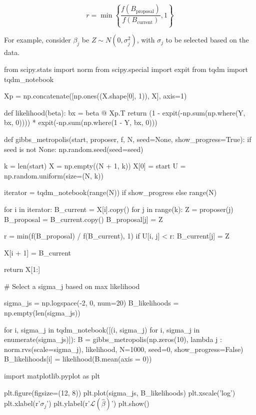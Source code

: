\[ r = \min \left\{ \frac{f\left(B_\text{proposal}\right)}{f\left(B_\text{current}\right)}, 1\right\} \]

For example, consider \(\beta_{j}\) be
\(Z \sim N(0, \sigma_{j}^{2})\), with \(\sigma_{j}\) to be selected based on
the data.

\begin{python}
from scipy.stats import norm
from scipy.special import expit
from tqdm import tqdm_{n}otebook

Xp = np.concatenate([np.ones((X.shape[0], 1)), X], axis=1)

def likelihood(beta):
    bx = beta @ Xp.T
    return (1 - expit(-np.sum(np.where(Y, bx, 0)))) * expit(-np.sum(np.where(1 - Y, bx, 0)))

def gibbs_metropolis(start, proposer, f, N, seed=None, show_progress=True):
    if seed is not None:
        np.random.seed(seed=seed)
    
    k = len(start)
    X = np.empty((N + 1, k))
    X[0] = start
    U = np.random.uniform(size=(N, k))
    
    iterator = tqdm_{n}otebook(range(N)) if show_progress else range(N)
    
    for i in iterator:
        B_current = X[i].copy()
        for j in range(k):
            Z = proposer(j)
            B_proposal = B_current.copy()
            B_proposal[j] = Z
            
            r = min(f(B_proposal) / f(B_current), 1)
            if U[i, j] < r:
                B_current[j] = Z
                
        X[i + 1] = B_current
    
    return X[1:]
\end{python}

\begin{python}
# Select a sigma_{j} based on max likelihood

sigma_{j}s = np.logspace(-2, 0, num=20)
B_likelihoods = np.empty(len(sigma_{j}s))

for i, sigma_{j} in tqdm_{n}otebook([(i, sigma_{j}) for i, sigma_{j} in enumerate(sigma_{j}s)]):
    B = gibbs_metropolis(np.zeros(10), lambda j : norm.rvs(scale=sigma_{j}), likelihood, N=1000, seed=0, show_progress=False)
    B_likelihoods[i] = likelihood(B.mean(axis = 0))
\end{python}

\begin{python}
import matplotlib.pyplot as plt

plt.figure(figsize=(12, 8))
plt.plot(sigma_{j}s, B_likelihoods)
plt.xscale('log')
plt.xlabel(r'$\sigma_{j}$')
plt.ylabel(r'$\mathcal{L}(\hat{\beta})$')
plt.show()
\end{python}

